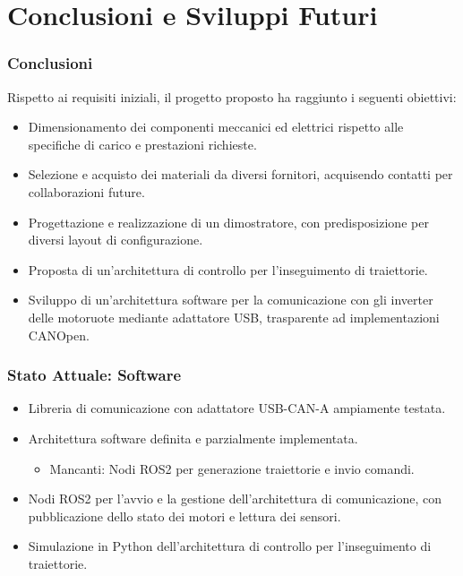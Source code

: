 \section{Conclusioni e Sviluppi Futuri}


\begin{frame}
    \frametitle{Conclusioni}
    Rispetto ai requisiti iniziali, il progetto proposto ha raggiunto i seguenti obiettivi:
    \begin{itemize}
        \item Dimensionamento dei componenti meccanici ed elettrici rispetto alle specifiche di carico e prestazioni richieste.
        \item Selezione e acquisto dei materiali da diversi fornitori, acquisendo contatti per collaborazioni future.
        \item Progettazione e realizzazione di un dimostratore, con predisposizione per diversi layout di configurazione.
        \item Proposta di un'architettura di controllo per l'inseguimento di traiettorie.
        \item Sviluppo di un'architettura software per la comunicazione con gli inverter delle motoruote mediante adattatore USB, trasparente ad implementazioni CANOpen.
    \end{itemize}
\end{frame}
\begin{frame}
    \frametitle{Stato Attuale: Software}
    \begin{itemize}
        \item Libreria di comunicazione con adattatore USB-CAN-A ampiamente testata.
        \item Architettura software definita e parzialmente implementata.
              \begin{itemize}
                  \item Mancanti: Nodi ROS2 per generazione traiettorie e invio comandi.
              \end{itemize}
        \item Nodi ROS2 per l'avvio e la gestione dell'architettura di comunicazione, con pubblicazione dello stato dei motori e lettura dei sensori.
        \item Simulazione in Python dell'architettura di controllo per l'inseguimento di traiettorie.
    \end{itemize}
\end{frame}
